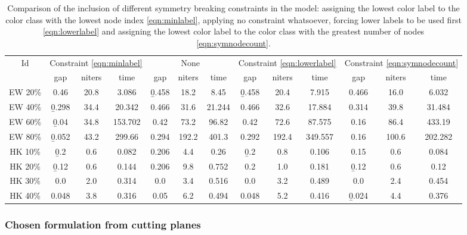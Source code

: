 \begin{sidewaystable}
\label{table:models:sym}
\centering

\begin{tabular}{|c|ccc|ccc|ccc|ccc|}
\hline
\multicolumn{1}{|c|}{Id} & \multicolumn{3}{|c|}{Constraint \ref{eqn:minlabel}} & \multicolumn{3}{|c|}{None} & \multicolumn{3}{|c|}{Constraint \ref{eqn:lowerlabel}} & \multicolumn{3}{|c|}{Constraint \ref{eqn:symnodecount}}
\\
 & gap & niters & time & gap & niters & time & gap & niters & time & gap & niters & time
\\
\hline
EW 20\% & 0.46 & 20.8 & 3.086 & \b{0.458} & 18.2 & 8.45 & \b{0.458} & 20.4 & 7.915 & 0.466 & 16.0 & 6.032
\\
EW 40\% & \b{0.298} & 34.4 & 20.342 & 0.466 & 31.6 & 21.244 & 0.466 & 32.6 & 17.884 & 0.314 & 39.8 & 31.484
\\
EW 60\% & \b{0.04} & 34.8 & 153.702 & 0.42 & 73.2 & 96.82 & 0.42 & 72.6 & 87.575 & 0.16 & 86.4 & 433.19
\\
EW 80\% & \b{0.052} & 43.2 & 299.66 & 0.294 & 192.2 & 401.3 & 0.292 & 192.4 & 349.557 & 0.16 & 100.6 & 202.282
\\
\hline
HK 10\% &  \b{0.2} &  0.6 & 0.082 & 0.206 &  4.4 & 0.26 &  \b{0.2} &  0.8 & 0.106 & 0.15 &  0.6 & 0.084
\\
HK 20\% & \b{0.12} &  0.6 & 0.144 & 0.206 &  9.8 & 0.752 &  0.2 &  1.0 & 0.181 & \b{0.12} &  0.6 & 0.12
\\
HK 30\% &  0.0 &  2.0 & 0.314 &  0.0 &  3.4 & 0.516 &  0.0 &  3.2 & 0.489 &  0.0 &  2.4 & 0.454
\\
HK 40\% & 0.048 &  3.8 & 0.316 & 0.05 &  6.2 & 0.494 & 0.048 &  5.2 & 0.416 & \b{0.024} &  4.4 & 0.376
\\
\hline 
 \end{tabular}

\caption{Comparison of the inclusion of different symmetry breaking constraints in the model: assigning the lowest color label to the color class with the lowest node index \eqref{eqn:minlabel}, applying no constraint whatsoever, forcing lower labels to be used first \eqref{eqn:lowerlabel} and assigning the lowest color label to the color class with the greatest number of nodes \eqref{eqn:symnodecount}.}

\end{sidewaystable}

\subsubsection{Chosen formulation from cutting planes}
\label{subsubsec:results:model:chosen}

